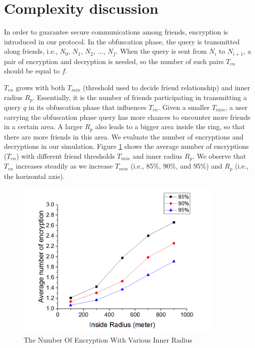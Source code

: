 \section{ Complexity discussion}

\noindent In order to guarantee secure communications among friends, encryption is introduced in our protocol. In the obfuscation phase, the query is transmitted along friends, i.e., ${N}_{0}$, ${N}_{1}$, ${N}_{2}$, ..., ${N}_{f}$. When the query is sent from ${N}_{i}$ to ${N}_{i+1}$, a pair of encryption and decryption is needed, so the number of such pairs $T_{en}$ should be equal to $f$. 

$T_{en}$ grows with both ${T}_{min}$ (threshold used to decide friend relationship) and inner radius ${R}_{p}$. Essentially, it is the number of friends participating in transmitting a query $q$ in its obfuscation phase that influences $T_{en}$. Given a smaller ${T}_{min}$, a user carrying the obfuscation phase query has more chances to encounter more friends in a certain area. A larger ${R}_{p}$ also leads to a bigger area inside the ring, so that there are more friends in this area. We evaluate the number of encryptions and decryptions in our simulation. Figure \ref{fig:NumOfEncWithInnerR} shows the average number of encryptions ($T_{en}$) with different friend thresholds ${T}_{min}$ and inner radius ${R}_{p}$. We observe that $T_{en}$ increases steadily as we increase ${T}_{min}$ (i.e., 85\%, 90\%, and 95\%) and ${R}_{p}$ (i.e., the horizontal axis).

\begin{figure} [H]
  \centering 
  \includegraphics[width=4.0in]{figures/NumOfEncWithInnerR.png}
  \caption{The Number Of Encryption With Various Inner Radius} 
  \label{fig:NumOfEncWithInnerR} %
\end{figure}

